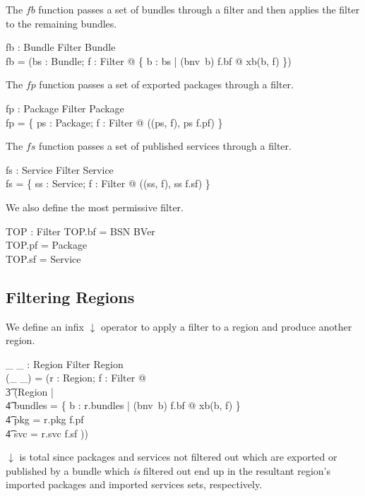 \documentclass[a4paper,9pt]{article}
\begin{document}
The $fb$ function passes a set of bundles through a filter and then
applies the filter to the remaining bundles.
\begin{axdef}
  fb : \power Bundle \cross Filter \fun \power Bundle \\
\where
  fb = (\lambda bs : \power Bundle; f : Filter @ \{ b : bs | (bnv~b) \in f.bf @ xb(b, f) \}) \\
\end{axdef}

The $fp$ function passes a set of exported packages through a filter.
\begin{axdef}
  fp : \power Package \cross Filter \fun \power Package \\
\where
  fp = \{ ps : \power Package; f : Filter @ ((ps, f), ps \cap f.pf) \}
\end{axdef}

The $fs$ function passes a set of published services through a filter.
\begin{axdef}
  fs : \power Service \cross Filter \fun \power Service \\
\where
  fs = \{ ss : \power Service; f : Filter @ ((ss, f), ss \cap f.sf) \}
\end{axdef}

We also define the most permissive filter.
\begin{axdef}
  TOP : Filter
\where
  TOP.bf = BSN \cross BVer \\
  TOP.pf = Package \\
  TOP.sf = Service \\
\end{axdef}

\subsection{Filtering Regions}

We define an infix $\downarrow$ operator to apply a filter to a region and produce another region.
\begin{axdef}
  \_ \downarrow \_ : Region \cross Filter \fun Region \\
\where
  (\_ \downarrow \_) = (\lambda r : Region;  f : Filter @ \\
\t3   (\mu Region | \\
\t4 bundles = \{ b : r.bundles | (bnv~b) \in f.bf @ xb(b, f) \} \land \\
\t4 pkg = r.pkg \cap f.pf \land \\
\t4 svc = r.svc \cap f.sf )) \\
\end{axdef}
$\downarrow$ is total since packages and services not filtered out which are exported or published by a
bundle which \textit{is} filtered out end up
in the resultant region's imported packages and imported services sets, respectively.
\end{document}
